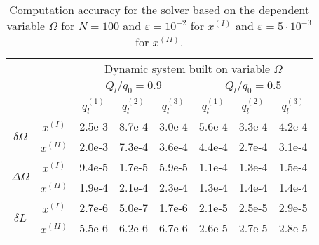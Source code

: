 \begin{table}
\centering
\begin{tabular}{c c|c@{}|c@{}|c@{}|c@{}|c@{}|c@{}|}
\cline{3-8}
& & \multicolumn{6}{c|}{Dynamic system built on variable $\Omega$}\\ \cline{3-8}
\cline{3-8}
& & \multicolumn{3}{c|}{$Q_l/q_0=0.9$} & \multicolumn{3}{c|}{$Q_l/q_0=0.5$} \\ \cline{3-8}
& & $q_l^{(1)}$ & $q_l^{(2)}$ & $q_l^{(3)}$ & $q_l^{(1)}$ & $q_l^{(2)}$ & $q_l^{(3)}$ \\ \cline{1-8}
\multicolumn{1}{|c}{\multirow{2}{*}{$\delta \Omega$}} & \multicolumn{1}{|c|}{$x^{(I)}$}
 &2.5e-3&8.7e-4&3.0e-4&5.6e-4&3.3e-4&4.2e-4
 \\ \cline{2-8} \multicolumn{1}{|c}{} & \multicolumn{1}{|c|}{$x^{(II)}$}
&2.0e-3&7.3e-4&3.6e-4&4.4e-4&2.7e-4&3.1e-4
  \\ \cline{1-8} \multicolumn{1}{|c}{\multirow{2}{*}{$\Delta \Omega$}} & \multicolumn{1}{|c|}{$x^{(I)}$}
&9.4e-5&1.7e-5&5.9e-5&1.1e-4&1.3e-4&1.5e-4
 \\ \cline{2-8} \multicolumn{1}{|c}{} & \multicolumn{1}{|c|}{$x^{(II)}$}
&1.9e-4&2.1e-4&2.3e-4&1.3e-4&1.4e-4&1.4e-4
  \\ \cline{1-8} \multicolumn{1}{|c}{\multirow{2}{*}{$\delta L$}} & \multicolumn{1}{|c|}{$x^{(I)}$}
&2.7e-6&5.0e-7&1.7e-6&2.1e-5&2.5e-5&2.9e-5
 \\ \cline{2-8} \multicolumn{1}{|c}{} & \multicolumn{1}{|c|}{$x^{(II)}$}
&5.5e-6&6.2e-6&6.7e-6&2.6e-5&2.7e-5&2.8e-5
 \\ \cline{1-8}
\end{tabular}
\caption{Computation accuracy for the solver based on the dependent variable $\Omega$ for $N=100$ and $\varepsilon=10^{-2}$ for $x^{(I)}$ and $\varepsilon=5\cdot10^{-3}$ for $x^{(II)}$.}
\label{table_Omega}
\end{table}




